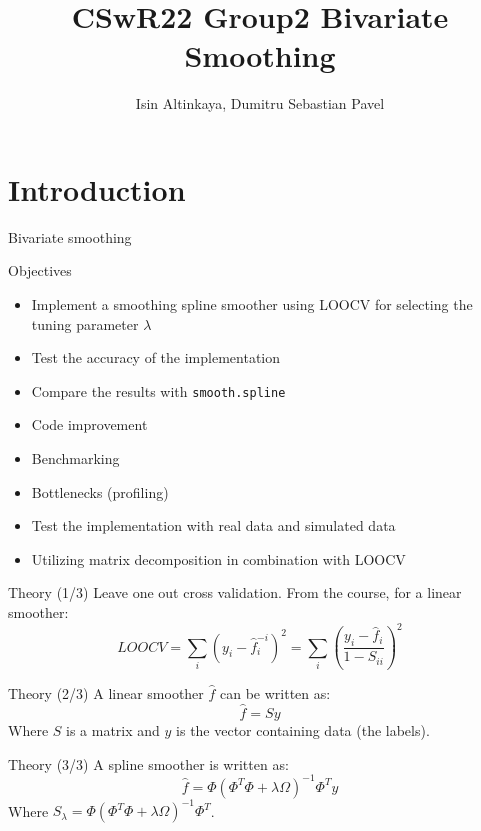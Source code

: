 \documentclass[
  ignorenonframetext,
]{beamer}
\title{CSwR22 Group2 Bivariate Smoothing}
\author{Isin Altinkaya, Dumitru Sebastian Pavel}
\date{}
\providecommand{\tightlist}{%
  \setlength{\itemsep}{0pt}\setlength{\parskip}{0pt}}\usepackage{longtable,booktabs,array}
\begin{document}
\frame{\titlepage}
\ifdefined\Shaded\renewenvironment{Shaded}{\begin{tcolorbox}[frame hidden, breakable, boxrule=0pt, sharp corners, enhanced, borderline west={3pt}{0pt}{shadecolor}, interior hidden]}{\end{tcolorbox}}\fi

\hypertarget{introduction}{%
\section{Introduction}\label{introduction}}

\begin{frame}{Bivariate smoothing}
\protect\hypertarget{bivariate-smoothing}{}
\end{frame}

\begin{frame}[fragile]{Objectives}
\protect\hypertarget{objectives}{}
\begin{itemize}
\tightlist
\item
  Implement a smoothing spline smoother using LOOCV for selecting the
  tuning parameter \(\lambda\)
\item
  Test the accuracy of the implementation
\item
  Compare the results with \texttt{smooth.spline}
\item
  Code improvement
\item
  Benchmarking
\item
  Bottlenecks (profiling)
\item
  Test the implementation with real data and simulated data
\item
  Utilizing matrix decomposition in combination with LOOCV
\end{itemize}
\end{frame}

\begin{frame}{Theory (1/3)}
\protect\hypertarget{theory-13}{}
Leave one out cross validation. From the course, for a linear smoother:
\[LOOCV=\sum_i (y_i - \hat{f}^{-i}_i)^2=\sum_i (\frac{y_i - \hat{f}_i}{1 - S_{ii}})^2\]
\end{frame}

\begin{frame}{Theory (2/3)}
\protect\hypertarget{theory-23}{}
A linear smoother \(\hat{f}\) can be written as: \[\hat{f}=Sy\] Where
\(S\) is a matrix and \(y\) is the vector containing data (the labels).
\end{frame}

\begin{frame}{Theory (3/3)}
\protect\hypertarget{theory-33}{}
A spline smoother is written as:
\[\hat{f}=\Phi(\Phi^T\Phi + \lambda \Omega)^{-1}\Phi^Ty\] Where
\(S_{\lambda}=\Phi(\Phi^T\Phi + \lambda \Omega)^{-1}\Phi^T\).
\end{frame}
\end{document}
